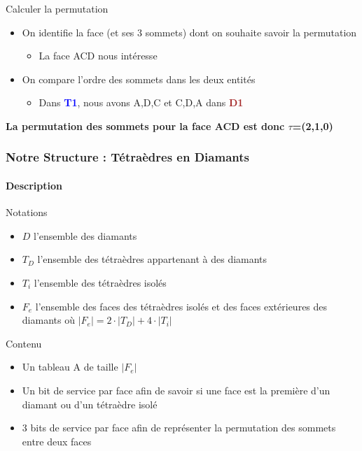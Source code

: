 \documentclass[9pt]{beamer}
\begin{document}
\begin{frame}
\begin{block}{Calculer la permutation}
\begin{itemize}
\item On identifie la face (et ses 3 sommets) dont on souhaite savoir la permutation
\begin{itemize}
\scriptsize
\item La face ACD nous intéresse
\end{itemize}
\item On compare l'ordre des sommets dans les deux entités
\begin{itemize}
\scriptsize
\item Dans \textcolor{blue}{\textbf{T1}}, nous avons A,D,C et C,D,A dans \textcolor{brown}{\textbf{D1}} 
\end{itemize}
\end{itemize}
\textbf{La permutation des sommets pour la face ACD est donc $\tau$=(2,1,0)}
\end{block}
\end{frame}


\begin{frame}
\frametitle{Notre Structure : Tétraèdres en Diamants}
\framesubtitle{Description}
\begin{block}{Notations}
\begin{itemize}
\item $D$ l'ensemble des diamants
\item $T_D$ l'ensemble des tétraèdres appartenant à des diamants
\item $T_i$ l'ensemble des tétraèdres isolés
\item $F_e$ l'ensemble des faces des tétraèdres isolés et des faces extérieures des diamants où $|F_e|=2\cdot |T_D|+4\cdot |T_i|$\\
\end{itemize}
\end{block}

\begin{block}{Contenu}
\begin{itemize}
\item Un tableau A de taille $|F_e|$
\item Un bit de service par face afin de savoir si une face est la première d'un diamant ou d'un tétraèdre isolé
\item 3 bits de service par face afin de représenter la permutation des sommets entre deux faces
\end{itemize}
\end{block}
\end{frame}
\end{document}
